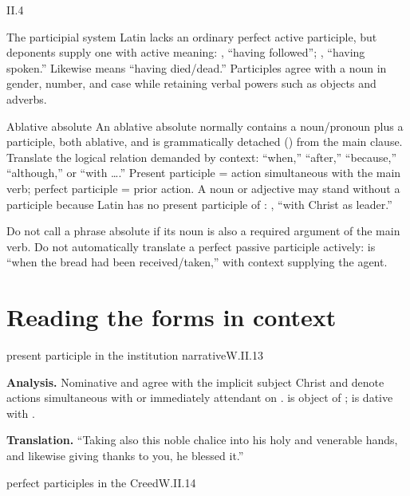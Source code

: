 \begin{courseunit}{II.4}
\begin{grammarbox}{The participial system}
Latin lacks an ordinary perfect active participle, but deponents supply one with active
meaning: , ``having followed''; , ``having spoken.''  Likewise
 means ``having died/dead.''  Participles agree with a noun in gender, number,
and case while retaining verbal powers such as objects and adverbs.
\end{grammarbox}

\begin{grammarbox}{Ablative absolute}
An ablative absolute normally contains a noun/pronoun plus a participle, both ablative, and is
grammatically detached () from the main clause.  Translate the logical
relation demanded by context: ``when,'' ``after,'' ``because,'' ``although,'' or
``with \ldots{}.''  Present participle = action simultaneous with the main verb; perfect
participle = prior action.  A noun or adjective may stand without a participle because Latin
has no present participle of : , ``with Christ as leader.''

Do not call a phrase absolute if its noun is also a required argument of the main verb.  Do not
automatically translate a perfect passive participle actively:  is ``when
the bread had been received/taken,'' with context supplying the agent.
\end{grammarbox}

\section{Reading the forms in context}

\begin{workedexample}{present participle in the institution narrative}{W.II.13}

\textbf{Analysis.}  Nominative  and  agree with the implicit
subject Christ and denote actions simultaneous with or immediately attendant on
.   is object of ;  is dative
with .

\textbf{Translation.}  ``Taking also this noble chalice into his holy and venerable hands,
and likewise giving thanks to you, he blessed it.''
\end{workedexample}

\begin{workedexample}{perfect participles in the Creed}{W.II.14}


\end{workedexample}
\end{courseunit}
